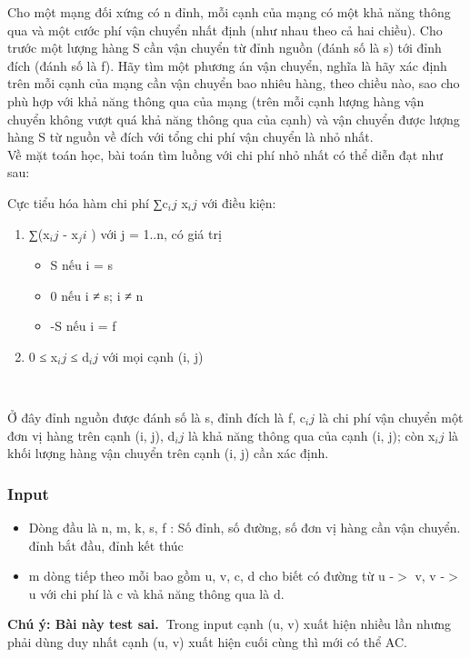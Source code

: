 

Cho một mạng đối xứng có n đỉnh, mỗi cạnh của mạng có một khả năng thông qua và một cước phí vận chuyển nhất định (như nhau theo cả hai chiều). Cho trước một lượng hàng S cần vận chuyển từ đỉnh nguồn (đánh số là s) tới đỉnh đích (đánh số là f). Hãy tìm một phương án vận chuyển, nghĩa là hãy xác định trên mỗi cạnh của mạng cần vận chuyển bao nhiêu hàng, theo chiều nào, sao cho phù hợp với khả năng thông qua của mạng (trên mỗi cạnh lượng hàng vận chuyển không vượt quá khả năng thông qua của cạnh) và vận chuyển được lượng hàng S từ nguồn về đích với tổng chi phí vận chuyển là nhỏ nhất.
\\Về mặt toán học, bài toán tìm luồng với chi phí nhỏ nhất có thể diễn đạt như sau:

Cực tiểu hóa hàm chi phí ∑c$_ij $ x$_ij $ với điều kiện:
\begin{enumerate}
	\item ∑(x$_ij $ - x$_ji $ ) với j = 1..n, có giá trị
\begin{itemize}
	\item S nếu i = s
	\item 0 nếu i ≠ s; i ≠ n
	\item -S nếu i = f
\end{itemize}
	\item 0 ≤ x$_ij $ ≤ d$_ij $ với mọi cạnh (i, j)

 
\end{enumerate}

Ở đây đỉnh nguồn được đánh số là s, đỉnh đích là f, c$_ij $ là chi phí vận chuyển một đơn vị hàng trên cạnh (i, j), d$_ij $ là khả năng thông qua của cạnh (i, j); còn x$_ij $ là khối lượng hàng vận chuyển trên cạnh (i, j) cần xác định.

\subsubsection{Input}
\begin{itemize}
	\item Dòng đầu là n, m, k, s, f : Số đỉnh, số đường, số đơn vị hàng cần vận chuyển. đỉnh bắt đầu, đỉnh kết thúc
	\item m dòng tiếp theo mỗi bao gồm u, v, c, d cho biết có đường từ u -$>$ v, v -$>$ u với chi phí là c và khả năng thông qua là d.
\end{itemize}

\textbf{Chú ý: Bài này test sai. }Trong input cạnh (u, v) xuất hiện nhiều lần nhưng phải dùng duy nhất cạnh (u, v) xuất hiện cuối cùng thì mới có thể AC.

